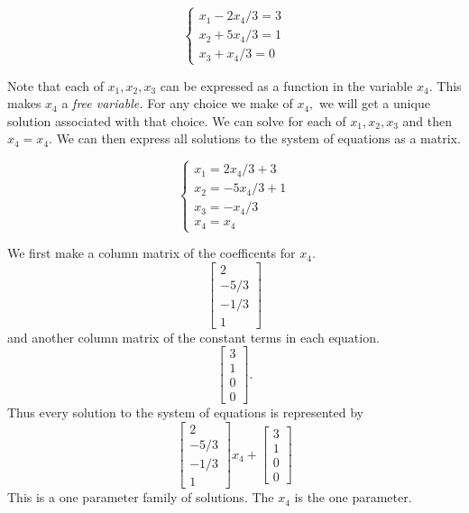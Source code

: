 \begin{example}
\begin{solution}
        \[\begin{cases}
            x_1 - 2x_4/3 = 3 \\
            x_2 + 5x_4/3 = 1 \\
            x_3 + x_4/3 = 0
        \end{cases}\]

        Note that each of \(x_1, x_2, x_3\) can be expressed as a function in the variable \(x_4.\) This makes \(x_4\) a \emph{free variable.} For any choice we make of \(x_4,\) we will get a unique solution associated with that choice. We can solve for each of \(x_1,x_2,x_3\) and then \(x_4=x_4.\) We can then express all solutions to the system of equations as a matrix.

        \[\begin{cases}
            x_1 = 2x_4/3 + 3 \\
            x_2 = - 5x_4/3 + 1 \\
            x_3 = - x_4/3 \\
            x_4 = x_4
        \end{cases}\]

        We first make a column matrix of the coefficents for \(x_4.\)
        \[\begin{bmatrix}
            2 \\
            -5/3 \\
            -1/3 \\
            1
        \end{bmatrix}\]
        and another column matrix of the constant terms in each equation.
        \[\begin{bmatrix}
            3 \\
            1 \\
            0 \\
            0
        \end{bmatrix}.\]
        Thus every solution to the system of equations is represented by
        \[\begin{bmatrix}
            2 \\
            -5/3 \\
            -1/3 \\
            1
        \end{bmatrix}x_4 + \begin{bmatrix}
            3 \\
            1 \\
            0 \\
            0
        \end{bmatrix}\]
        This is a one parameter family of solutions. The \(x_4\) is the one parameter.
    \end{solution}
\end{example}

